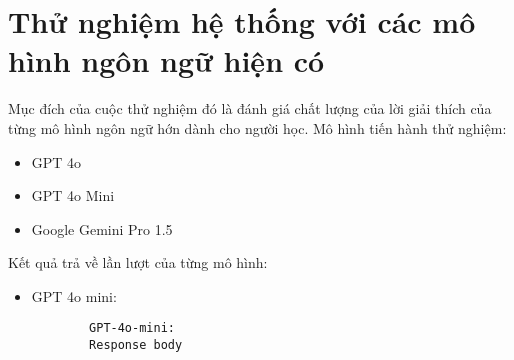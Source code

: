 \section{Thử nghiệm hệ thống với các mô hình ngôn ngữ hiện có}
Mục đích của cuộc thử nghiệm đó là đánh giá chất lượng của lời giải thích của từng mô hình ngôn ngữ hớn dành cho người học. Mô hình tiến hành thử nghiệm:
\begin{itemize}
    \item GPT 4o
    \item GPT 4o Mini
    \item Google Gemini Pro 1.5
\end{itemize}
Kết quả trả về lần lượt của từng mô hình:
\begin{itemize}
    \item GPT 4o mini:
    \begin{verbatim}
        GPT-4o-mini:
        Response body
        

\end{verbatim}
\end{itemize}
